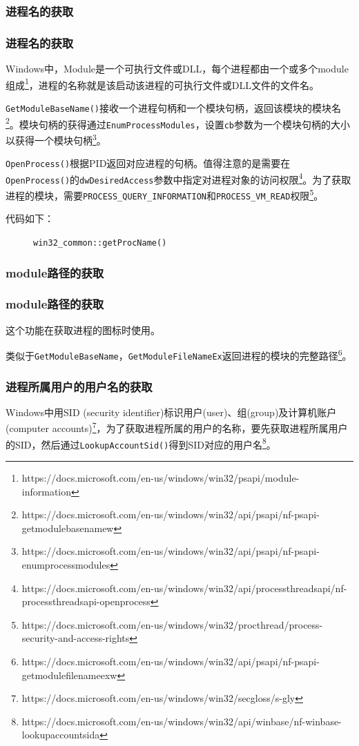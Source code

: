 \documentclass{beamer}
\newcommand\code[1]{\texttt{#1}}
\begin{document}
\subsubsection{进程名的获取}
\begin{frame}
    \frametitle{进程名的获取}
    Windows中，Module是一个可执行文件或DLL，每个进程都由一个或多个module组成\footnote{https://docs.microsoft.com/en-us/windows/win32/psapi/module-information}，进程的名称就是该启动该进程的可执行文件或DLL文件的文件名。

\code{GetModuleBaseName()}接收一个进程句柄和一个模块句柄，返回该模块的模块名\footnote{https://docs.microsoft.com/en-us/windows/win32/api/psapi/nf-psapi-getmodulebasenamew}。模块句柄的获得通过\code{EnumProcessModules}，设置\code{cb}参数为一个模块句柄的大小以获得一个模块句柄\footnote{https://docs.microsoft.com/en-us/windows/win32/api/psapi/nf-psapi-enumprocessmodules}。

\end{frame}

\begin{frame}
\code{OpenProcess()}根据PID返回对应进程的句柄。值得注意的是需要在\code{OpenProcess()}的\code{dwDesiredAccess}参数中指定对进程对象的访问权限\footnote{https://docs.microsoft.com/en-us/windows/win32/api/processthreadsapi/nf-processthreadsapi-openprocess}。为了获取进程的模块，需要\code{PROCESS\_QUERY\_INFORMATION}和\code{PROCESS\_VM\_READ}权限\footnote{https://docs.microsoft.com/en-us/windows/win32/procthread/process-security-and-access-rights}。
\end{frame}

\begin{frame}
代码如下：

\begin{figure}[H]
    \ttfamily
    
    \caption{\code{win32\_common::getProcName()}}
\end{figure}
\end{frame}

\subsubsection{module路径的获取}
\begin{frame}
    \frametitle{module路径的获取}
    这个功能在获取进程的图标时使用。

类似于\code{GetModuleBaseName}，\code{GetModuleFileNameEx}返回进程的模块的完整路径\footnote{https://docs.microsoft.com/en-us/windows/win32/api/psapi/nf-psapi-getmodulefilenameexw}。

\subsubsection{进程所属用户的用户名的获取}
Windows中用SID (security identifier)标识用户(user)、组(group)及计算机账户(computer accounts)\footnote{https://docs.microsoft.com/en-us/windows/win32/secgloss/s-gly}，为了获取进程所属的用户的名称，要先获取进程所属用户的SID，然后通过\code{LookupAccountSid()}得到SID对应的用户名\footnote{https://docs.microsoft.com/en-us/windows/win32/api/winbase/nf-winbase-lookupaccountsida}。
\end{frame}
\end{document}
